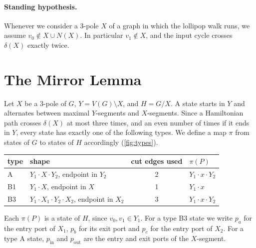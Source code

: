 \documentclass[11pt]{article}
\theoremstyle{definition}
\newcommand{\inn}{\mathrm{in}}
\begin{document}
\paragraph{Standing hypothesis.} Whenever we consider a 3-pole $X$ of a graph in which the
lollipop walk runs, we assume $v_0 \notin X \cup N(X)$. In particular $v_1 \notin X$, and the
input cycle crosses $\delta(X)$ exactly twice.

\section{The Mirror Lemma}\label{sec:mirror}

Let $X$ be a 3-pole of $G$, $Y = V(G) \setminus X$, and $H = G/X$. A state starts in $Y$ and
alternates between maximal $Y$-segments and $X$-segments. Since a Hamiltonian path crosses
$\delta(X)$ at most three times, and an even number of times if it ends in $Y$, every state has
exactly one of the following types. We define a map $\pi$ from states of $G$ to states of $H$
accordingly (\cref{fig:types}).
\begin{center}
\begin{tabular}{llcl}
\toprule
type & shape & cut edges used & $\pi(P)$ \\
\midrule
A  & $Y_1 \cdot X \cdot Y_2$, endpoint in $Y_2$ & 2 & $Y_1 \cdot x \cdot Y_2$ \\
B1 & $Y_1 \cdot X$, endpoint in $X$ & 1 & $Y_1 \cdot x$ \\
B3 & $Y_1 \cdot X_1 \cdot Y_2 \cdot X_2$, endpoint in $X_2$ & 3 & $Y_1 \cdot x \cdot Y_2$ \\
\bottomrule
\end{tabular}
\end{center}
Each $\pi(P)$ is a state of $H$, since $v_0, v_1 \in Y_1$. For a type B3 state we write $p_a$ for
the entry port of $X_1$, $p_b$ for its exit port and $p_c$ for the entry port of $X_2$. For a type A
state, $p_\inn$ and $p_{\mathrm{out}}$ are the entry and exit ports of the $X$-segment.
\end{document}
